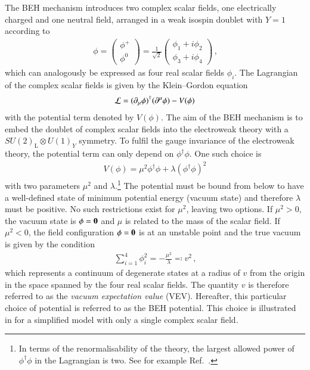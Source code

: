 The BEH mechanism introduces two complex scalar fields, one electrically charged
and one neutral field, arranged in a weak isospin doublet with $Y = 1$ according
to
\begin{align*}
  \phi =
  \begin{pmatrix}
    \phi^+ \\
    \phi^0
  \end{pmatrix}
  = \frac{1}{\sqrt{2}}
  \begin{pmatrix}
    \phi_1 + i \phi_2 \\
    \phi_3 + i \phi_4
  \end{pmatrix} \,\text{,}
\end{align*}
which can analogously be expressed as four real scalar fields $\phi_i$. The
Lagrangian of the complex scalar fields is given by the Klein--Gordon equation
\begin{align*}
  \mathcal{L} = (\partial_\mu \phi)^\dagger (\partial^\mu \phi) - V(\phi)
\end{align*}
with the potential term denoted by $V(\phi)$. The aim of the BEH mechanism is to
embed the doublet of complex scalar fields into the electroweak theory with a
$SU(2)_{\text{L}}\otimes U(1)_Y$ symmetry. To fulfil the gauge invariance of the
electroweak theory, the potential term can only depend on $\phi^\dagger
\phi$. One such choice is
\begin{align}
  V(\phi) = \mu^2 \phi^\dagger \phi + \lambda (\phi^\dagger \phi)^2
  \label{eq:higgs_potential}
\end{align}
with two parameters $\mu^2$ and $\lambda$.\footnote{In terms of the
  renormalisability of the theory, the largest allowed power of
  $\phi^\dagger \phi$ in the Lagrangian is two. See for example
  Ref.~\cite{Peskin:1995ev}.} The potential must be bound from below to have a
well-defined state of minimum potential energy (vacuum state) and therefore
$\lambda$ must be positive. No such restrictions exist for $\mu^2$, leaving two
options. If $\mu^2 > 0$, the vacuum state is $\phi = \myvec{0}$ and $\mu$ is
related to the mass of the scalar field. If $\mu^2 < 0$, the field configuration
$\phi = \myvec{0}$ is at an unstable point and the true vacuum is given by the
condition
\begin{align*}
  \sum_{i = 1}^4 \phi_i^2 = -\frac{\mu^2}{\lambda} \eqqcolon v^2 \,\text{,}
\end{align*}
which represents a continuum of degenerate states at a radius of $v$ from the
origin in the space spanned by the four real scalar fields. The quantity $v$ is
therefore referred to as the \emph{vacuum expectation value} (VEV). Hereafter,
this particular choice of potential is referred to as the BEH potential. This
choice is illustrated in  for a simplified model with only
a single complex scalar field.

